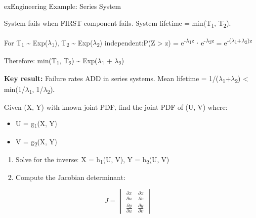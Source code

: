 \begin{PSbox}[unbreakable]{ex}{Engineering Example: Series System}

System fails when FIRST component fails. System lifetime = min(T\textsubscript{1}, T\textsubscript{2}).

For T\textsubscript{1} \textasciitilde{} Exp(\ensuremath{\lambda}\textsubscript{1}), T\textsubscript{2} \textasciitilde{} Exp(\ensuremath{\lambda}\textsubscript{2}) independent:\PSbr{}P(Z \textgreater{} z) = e\textsuperscript{-\ensuremath{\lambda}\textsubscript{1}z} \ensuremath{\cdot} e\textsuperscript{-\ensuremath{\lambda}\textsubscript{2}z} = e\textsuperscript{-(\ensuremath{\lambda}\textsubscript{1}+\ensuremath{\lambda}\textsubscript{2})z}

Therefore: min(T\textsubscript{1}, T\textsubscript{2}) \textasciitilde{} Exp(\ensuremath{\lambda}\textsubscript{1} + \ensuremath{\lambda}\textsubscript{2})

\textbf{Key result:} Failure rates ADD in series systems. Mean lifetime = 1/(\ensuremath{\lambda}\textsubscript{1}+\ensuremath{\lambda}\textsubscript{2}) \textless{} min(1/\ensuremath{\lambda}\textsubscript{1}, 1/\ensuremath{\lambda}\textsubscript{2}).

\end{PSbox}



Given (X, Y) with known joint PDF, find the joint PDF of (U, V) where:

\begin{itemize}
\tightlist
\item
  U = g\textsubscript{1}(X, Y)
\item
  V = g\textsubscript{2}(X, Y)
\end{itemize}


\begin{enumerate}
\def\labelenumi{\arabic{enumi}.}
\tightlist
\item
  Solve for the inverse: X = h\textsubscript{1}(U, V), Y = h\textsubscript{2}(U, V)
\item
  Compute the Jacobian determinant:
\end{enumerate}

\[J = \begin{vmatrix} \frac{\partial x}{\partial u} & \frac{\partial x}{\partial v} \\ \frac{\partial y}{\partial u} & \frac{\partial y}{\partial v} \end{vmatrix}\]

